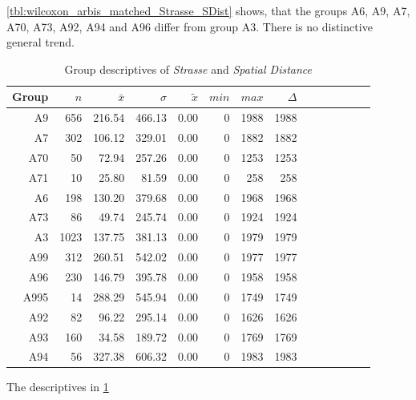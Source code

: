 \cref{tbl:wilcoxon_arbis_matched_Strasse_SDist} shows, that the groups A6, A9, A7, A70, A73, A92, A94 and A96 differ from group A3. There is no distinctive general trend.
\begin{table}[ht!]
	\tiny
	\centering
	\begin{tabular}{rrrrrrrrrrrrrr}
		\toprule
		Group & $n$ & $\bar{x}$ & $\sigma$ & $\tilde{x}$ & $min$ & $max$ & $\Delta$ \\
		\midrule
		A9   & 656  & 216.54 & 466.13 & 0.00 & 0 & 1988 & 1988 \\ 
		A7   & 302  & 106.12 & 329.01 & 0.00 & 0 & 1882 & 1882 \\ 
		A70  & 50   & 72.94  & 257.26 & 0.00 & 0 & 1253 & 1253 \\ 
		A71  & 10   & 25.80  & 81.59  & 0.00 & 0 & 258  & 258  \\ 
		A6   & 198  & 130.20 & 379.68 & 0.00 & 0 & 1968 & 1968 \\ 
		A73  & 86   & 49.74  & 245.74 & 0.00 & 0 & 1924 & 1924 \\ 
		A3   & 1023 & 137.75 & 381.13 & 0.00 & 0 & 1979 & 1979 \\ 
		A99  & 312  & 260.51 & 542.02 & 0.00 & 0 & 1977 & 1977 \\ 
		A96  & 230  & 146.79 & 395.78 & 0.00 & 0 & 1958 & 1958 \\ 
		A995 & 14   & 288.29 & 545.94 & 0.00 & 0 & 1749 & 1749 \\ 
		A92  & 82   & 96.22  & 295.14 & 0.00 & 0 & 1626 & 1626 \\ 
		A93  & 160  & 34.58  & 189.72 & 0.00 & 0 & 1769 & 1769 \\ 
		A94  & 56   & 327.38 & 606.32 & 0.00 & 0 & 1983 & 1983 \\ 
		\bottomrule
	\end{tabular}
	\caption{Group descriptives of \textit{Strasse} and \textit{Spatial Distance}}
	\label{tbl:descriptives_arbis_matched_Strasse_SDist}
\end{table}
The descriptives in \cref{tbl:descriptives_arbis_matched_Strasse_SDist}

